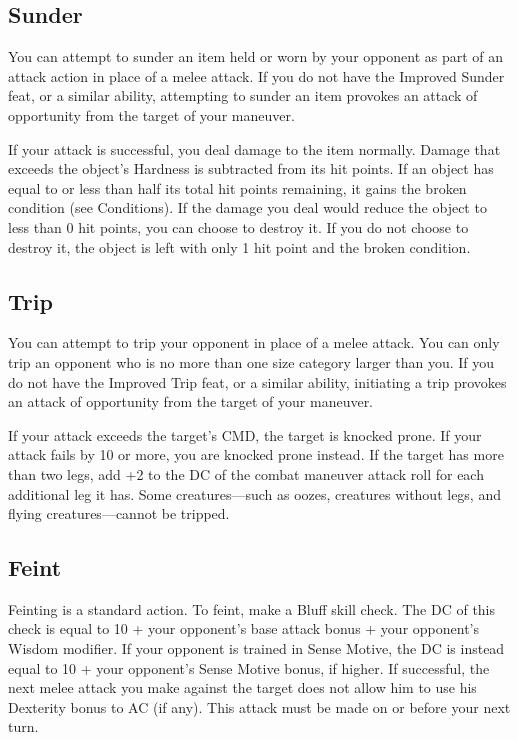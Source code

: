 \subsection{Sunder}

				
You can attempt to sunder an item held or worn by your opponent as part of an attack action in place of a melee attack. If you do not have the Improved Sunder feat, or a similar ability, attempting to sunder an item provokes an attack of opportunity from the target of your maneuver. 
				
If your attack is successful, you deal damage to the item normally. Damage that exceeds the object's Hardness is subtracted from its hit points. If an object has equal to or less than half its total hit points remaining, it gains the broken condition (see Conditions). If the damage you deal would reduce the object to less than 0 hit points, you can choose to destroy it. If you do not choose to destroy it, the object is left with only 1 hit point and the broken condition.
				
\subsection{Trip}

				
You can attempt to trip your opponent in place of a melee attack. You can only trip an opponent who is no more than one size category larger than you. If you do not have the Improved Trip feat, or a similar ability, initiating a trip provokes an attack of opportunity from the target of your maneuver.
				
If your attack exceeds the target's CMD, the target is knocked prone. If your attack fails by 10 or more, you are knocked prone instead. If the target has more than two legs, add +2 to the DC of the combat maneuver attack roll for each additional leg it has. Some creatures---such as oozes, creatures without legs, and flying creatures---cannot be tripped.
				
\subsection{Feint}

				
Feinting is a standard action. To feint, make a Bluff skill check. The DC of this check is equal to 10 + your opponent's base attack bonus + your opponent's Wisdom modifier. If your opponent is trained in Sense Motive, the DC is instead equal to 10 + your opponent's Sense Motive bonus, if higher. If successful, the next melee attack you make against the target does not allow him to use his Dexterity bonus to AC (if any). This attack must be made on or before your next turn.
				
